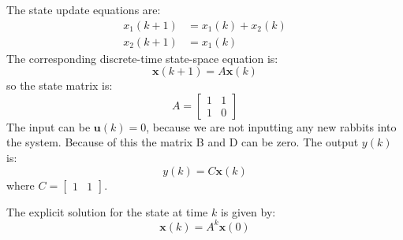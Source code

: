 \documentclass[10pt]{article}
\begin{document}
\begin{enumerate}
		The state update equations are:
		\begin{align*}
			x_1(k+1) &= x_1(k) + x_2(k) \\
			x_2(k+1) &= x_1(k)
		\end{align*}
		The corresponding discrete-time state-space equation is:
		$$
		\mathbf{x}(k+1) = A\mathbf{x}(k)
		$$
		so the state matrix is:
		$$
		A=\begin{bmatrix}
			1 & 1\\
			1 & 0
		\end{bmatrix}
		$$
		The input can be $\mathbf{u}(k)=0$, because we are not inputting any new rabbits into the system. Because of this the matrix B and D can be zero.
		The output $y(k)$ is:
		$$
		y(k) = C\mathbf{x}(k)
		$$
		where $C = \begin{bmatrix} 1 & 1 \end{bmatrix}$.
		
		The explicit solution for the state at time $k$ is given by:
		$$
		\mathbf{x}(k) = A^k \mathbf{x}(0)
		$$
		
	\end{enumerate}
	
\end{document}
